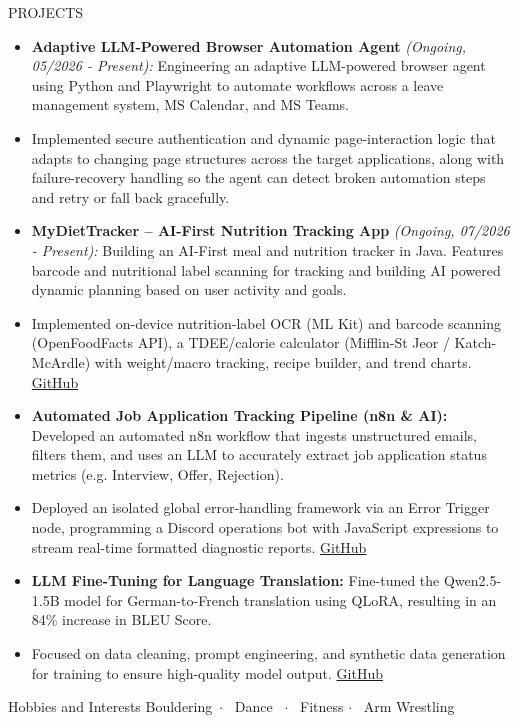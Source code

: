 \documentclass{resume}
\begin{document}
\begin{rSection}{PROJECTS}
\begin{itemize}
    \itemsep -1pt {}
    \item \textbf{Adaptive LLM-Powered Browser Automation Agent} \textit{(Ongoing, 05/2026 - Present):} Engineering an adaptive LLM-powered browser agent using Python and Playwright to automate workflows across a leave management system, MS Calendar, and MS Teams.
    \item[] Implemented secure authentication and dynamic page-interaction logic that adapts to changing page structures across the target applications, along with failure-recovery handling so the agent can detect broken automation steps and retry or fall back gracefully.
    \item \textbf{MyDietTracker -- AI-First Nutrition Tracking App} \textit{(Ongoing, 07/2026 - Present):} Building an AI-First meal and nutrition tracker in Java. Features barcode and nutritional label scanning for tracking and building AI powered dynamic planning based on user activity and goals.
    \item[] Implemented on-device nutrition-label OCR (ML Kit) and barcode scanning (OpenFoodFacts API), a TDEE/calorie calculator (Mifflin-St Jeor / Katch-McArdle) with weight/macro tracking, recipe builder, and trend charts. \href{https://github.com/dhruvkale17/MyDietTracker}{GitHub}
    \item \textbf{Automated Job Application Tracking Pipeline (n8n \& AI):} Developed an automated n8n workflow that ingests unstructured emails, filters them, and uses an LLM to accurately extract job application status metrics (e.g. Interview, Offer, Rejection).
    \item[] Deployed an isolated global error-handling framework via an Error Trigger node, programming a Discord operations bot with JavaScript expressions to stream real-time formatted diagnostic reports. \href{https://github.com/dhruvkale17/Automated-Job-Application-Tracking-n8n-AI}{GitHub}
    \item \textbf{LLM Fine-Tuning for Language Translation:} Fine-tuned the Qwen2.5-1.5B model for German-to-French translation using QLoRA, resulting in an 84\% increase in BLEU Score.
    \item[] Focused on data cleaning, prompt engineering, and synthetic data generation for training to ensure high-quality model output. \href{https://github.com/dhruvkale17/Fine-tuning-LLM-for-language-translation}{GitHub}
\end{itemize}
\end{rSection}

\begin{rSection}{Hobbies and Interests}
Bouldering\ $\cdot$ \ Dance \ $\cdot$ \ Fitness $\cdot$ \ Arm Wrestling
\end{rSection}
\end{document}
